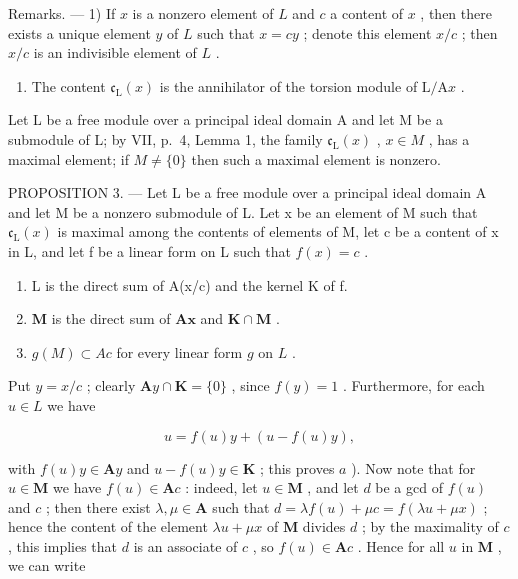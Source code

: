 Remarks. --- 1) If \(x\) is a nonzero element of \(L\) and \(c\) a content of \(x\) , then there exists a unique element \(y\) of \(L\) such that \(x = cy\) ; denote this element \(x / c\) ; then \(x / c\) is an indivisible element of \(L\) .

\begin{enumerate}
\def\labelenumi{\arabic{enumi})}
\setcounter{enumi}{1}
\tightlist
\item
  The content \(\mathfrak{c}_{\mathrm{L}}(x)\) is the annihilator of the torsion module of \(\mathrm{L} / \mathrm{A}x\) .
\end{enumerate}

Let L be a free module over a principal ideal domain A and let M be a submodule of L; by VII, p.~4, Lemma 1, the family \(\mathfrak{c}_{\mathrm{L}}(x)\) , \(x \in M\) , has a maximal element; if \(M \neq \{0\}\) then such a maximal element is nonzero.

PROPOSITION 3. --- Let L be a free module over a principal ideal domain A and let M be a nonzero submodule of L. Let x be an element of M such that \(\mathfrak{c}_{\mathrm{L}}(x)\) is maximal among the contents of elements of M, let c be a content of x in L, and let f be a linear form on L such that \(f(x) = c\) .

\begin{enumerate}
\def\labelenumi{\alph{enumi})}
\item
  L is the direct sum of A(x/c) and the kernel K of f.
\item
  \(\mathbf{M}\) is the direct sum of \(\mathbf{A}\mathbf{x}\) and \(\mathbf{K} \cap \mathbf{M}\) .
\item
  \(g(M) \subset Ac\) for every linear form \(g\) on \(L\) .
\end{enumerate}

Put \(y = x / c\) ; clearly \(\mathbf{A}y \cap \mathbf{K} = \{0\}\) , since \(f(y) = 1\) . Furthermore, for each \(u \in L\) we have

\[
u = f (u) y + (u - f (u) y),
\]

with \(f(u) y \in \mathbf{A}y\) and \(u - f(u)y \in \mathbf{K}\) ; this proves \(a\) ). Now note that for \(u \in \mathbf{M}\) we have \(f(u) \in \mathbf{A}c\) : indeed, let \(u \in \mathbf{M}\) , and let \(d\) be a gcd of \(f(u)\) and \(c\) ; then there exist \(\lambda, \mu \in \mathbf{A}\) such that \(d = \lambda f(u) + \mu c = f(\lambda u + \mu x)\) ; hence the content of the element \(\lambda u + \mu x\) of \(\mathbf{M}\) divides \(d\) ; by the maximality of \(c\) , this implies that \(d\) is an associate of \(c\) , so \(f(u) \in \mathbf{A}c\) . Hence for all \(u\) in \(\mathbf{M}\) , we can write

